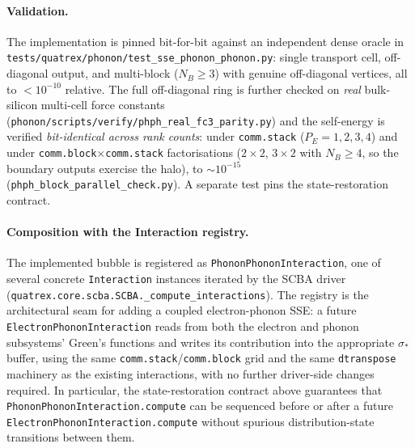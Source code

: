 \paragraph{Validation.} The implementation is pinned bit-for-bit
against an independent dense oracle in
\texttt{tests/quatrex/phonon/test\_sse\_phonon\_phonon.py}: single
transport cell, off-diagonal output, and multi-block ($N_B\ge 3$)
with genuine off-diagonal vertices, all to $<10^{-10}$ relative.
The full off-diagonal ring is further checked on \emph{real}
bulk-silicon multi-cell force constants
(\texttt{phonon/scripts/verify/phph\_real\_fc3\_parity.py}) and the
self-energy is verified \emph{bit-identical across rank counts}:
under \texttt{comm.stack} ($P_E=1,2,3,4$) and under
\texttt{comm.block}$\times$\texttt{comm.stack} factorisations
($2{\times}2$, $3{\times}2$ with $N_B\ge 4$, so the boundary outputs
exercise the halo), to $\sim10^{-15}$
(\texttt{phph\_block\_parallel\_check.py}). A separate test pins the
state-restoration contract.

\paragraph{Composition with the Interaction registry.}
The implemented bubble is registered as
\texttt{PhononPhononInteraction}, one of several concrete
\texttt{Interaction} instances iterated by the SCBA driver
(\texttt{quatrex.core.scba.SCBA.\_compute\_interactions}). The
registry is the architectural seam for adding a coupled
electron-phonon SSE: a future
\texttt{ElectronPhononInteraction} reads from both the electron
and phonon subsystems' Green's functions and writes its
contribution into the appropriate $\sigma_*$ buffer, using the
same \texttt{comm.stack}/\texttt{comm.block} grid and the same
\texttt{dtranspose} machinery as the existing interactions, with
no further driver-side changes required. In particular, the
state-restoration contract above guarantees that
\texttt{PhononPhononInteraction.compute} can be sequenced before
or after a future \texttt{ElectronPhononInteraction.compute}
without spurious distribution-state transitions between them.

